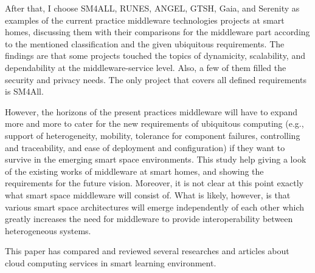 \documentclass[journal]{vgtc}                %
\begin{document}
After that, I choose SM4ALL, RUNES, ANGEL, GTSH, Gaia, and Serenity as examples of the current practice middleware technologies projects at smart homes, discussing them with their comparisons for the middleware part according to the mentioned classification and the given ubiquitous requirements. The findings are that some projects touched the topics of dynamicity, scalability, and dependability at the middleware-service level. Also, a few of them filled the security and privacy needs. The only project that covers all defined requirements is SM4All.

However, the horizons of the present practices middleware will have to expand more and more to cater for the new requirements of ubiquitous computing (e.g., support of heterogeneity, mobility, tolerance for component failures, controlling and traceability, and ease of deployment and configuration) if they want to survive in the emerging smart space environments. This study help giving a look of the existing works of middleware at smart homes, and showing the requirements for the future vision. Moreover, it is not clear at this point exactly what smart space middleware will consist of. What is likely, however, is that various smart space architectures will emerge independently of each other which greatly increases the need for middleware to provide interoperability between heterogeneous systems.

This paper has compared and reviewed several researches and articles about cloud computing services in smart learning environment.




\end{document}
